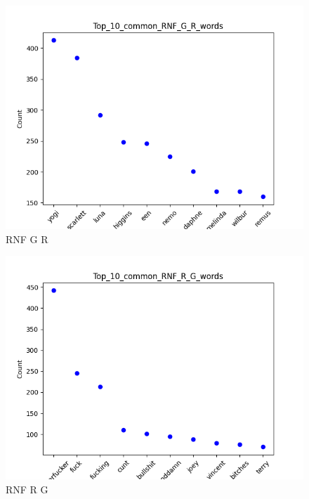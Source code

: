 \documentclass[a4paper]{article}
\begin{document}
\begin{figure}[ht]
    \centering
    \includegraphics[width=1\textwidth]{../stats/Top_10_common_RNF_G_R_words.png}
    \caption{RNF G R}
\end{figure}


\begin{figure}[ht]
    \centering
    \includegraphics[width=1\textwidth]{../stats/Top_10_common_RNF_R_G_words.png}
    \caption{RNF R G}
\end{figure}
\end{document}

